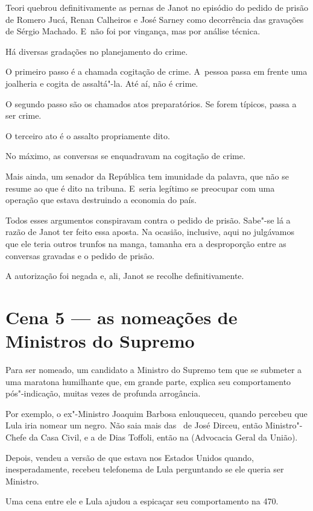 Teori quebrou definitivamente as pernas de Janot no episódio do pedido
de prisão de Romero Jucá, Renan Calheiros e José Sarney como decorrência
das gravações de Sérgio Machado. E~não foi por vingança, mas por análise
técnica.

Há diversas gradações no planejamento do crime.

O primeiro passo é a chamada cogitação de crime. A~pessoa passa em
frente uma joalheria e cogita de assaltá"-la. Até aí, não é crime.

O segundo passo são os chamados atos preparatórios. Se forem típicos,
passa a ser crime.

O terceiro ato é o assalto propriamente dito.

No máximo, as conversas se enquadravam na cogitação de crime.

Mais ainda, um senador da República tem imunidade da palavra, que não se
resume ao que é dito na tribuna. E~seria legítimo se preocupar com uma
operação que estava destruindo a economia do país.

Todos esses argumentos conspiravam contra o pedido de prisão. Sabe"-se lá
a razão de Janot ter feito essa aposta. Na ocasião, inclusive, aqui no
 julgávamos que ele teria outros trunfos na manga, tamanha era a
desproporção entre as conversas gravadas e o pedido de prisão.

A autorização foi negada e, ali, Janot se recolhe definitivamente.

\section{Cena 5 --- as nomeações de Ministros do Supremo}

Para ser nomeado, um candidato a Ministro do Supremo tem que se submeter
a uma maratona humilhante que, em grande parte, explica seu
comportamento pós"-indicação, muitas vezes de profunda arrogância.

Por exemplo, o ex"-Ministro Joaquim Barbosa enlouqueceu, quando percebeu
que Lula iria nomear um negro. Não saia mais das~ de José Dirceu, então
Ministro"-Chefe da Casa Civil, e a de Dias Toffoli, então na 
(Advocacia Geral da União).

Depois, vendeu a versão de que estava nos Estados Unidos quando,
inesperadamente, recebeu telefonema de Lula perguntando se ele queria
ser Ministro.

Uma cena entre ele e Lula ajudou a espicaçar seu comportamento na 
470.

